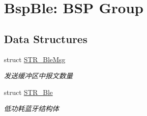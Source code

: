 \hypertarget{group___b_l_e}{\section{\-Bsp\-Ble\-: \-B\-S\-P \-Group}
\label{group___b_l_e}
}
\subsection*{\-Data \-Structures}
\begin{DoxyCompactItemize}
\item 
struct \hyperlink{struct_s_t_r___ble_msg}{\-S\-T\-R\-\_\-\-Ble\-Msg}
\begin{DoxyCompactList}\small\item\em 发送缓冲区中报文数量 \end{DoxyCompactList}\item 
struct \hyperlink{struct_s_t_r___ble}{\-S\-T\-R\-\_\-\-Ble}
\begin{DoxyCompactList}\small\item\em 低功耗蓝牙结构体 \end{DoxyCompactList}\end{DoxyCompactItemize}
